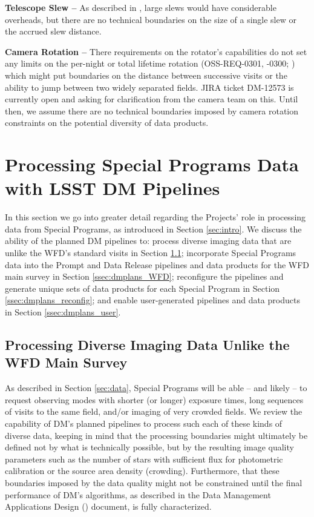 \documentclass[DM,lsstdoc,toc]{lsstdoc}
\begin{document}
{\bf Telescope Slew -- } As described in , large slews would have considerable overheads, but there are no technical boundaries on the size of a single slew or the accrued slew distance.

{\bf Camera Rotation -- } There requirements on the rotator's capabilities do not set any limits on the per-night or total lifetime rotation (OSS-REQ-0301, -0300; ) which might put boundaries on the distance between successive visits or the ability to jump between two widely separated fields. JIRA ticket DM-12573 is currently open and asking for clarification from the camera team on this. Until then, we assume there are no technical boundaries imposed by camera rotation constraints on the potential diversity of data products. 


\clearpage
\section{Processing Special Programs Data with LSST DM Pipelines} \label{sec:dmplans}

In this section we go into greater detail regarding the Projects' role in processing data from Special Programs, as introduced in Section \ref{sec:intro}. We discuss the ability of the planned DM pipelines to: process diverse imaging data that are unlike the WFD's standard visits in Section \ref{ssec:dmplans_NSV}; incorporate Special Programs data into the Prompt and Data Release pipelines and data products for the WFD main survey in Section \ref{ssec:dmplans_WFD}; reconfigure the pipelines and generate unique sets of data products for each Special Program in Section \ref{ssec:dmplans_reconfig}; and enable user-generated pipelines and data products in Section \ref{ssec:dmplans_user}.

\subsection{Processing Diverse Imaging Data Unlike the WFD Main Survey}\label{ssec:dmplans_NSV}

As described in Section \ref{sec:data}, Special Programs will be able -- and likely -- to request observing modes with shorter (or longer) exposure times, long sequences of visits to the same field, and/or imaging of very crowded fields. We review the capability of DM's planned pipelines to process such each of these kinds of diverse data, keeping in mind that the processing boundaries might ultimately be defined not by what is technically possible, but by the resulting image quality parameters such as the number of stars with sufficient flux for photometric calibration or the source area density (crowding). Furthermore, that these boundaries imposed by the data quality might not be constrained until the final performance of DM's algorithms, as described in the Data Management Applications Design () document, is fully characterized.
\end{document}
